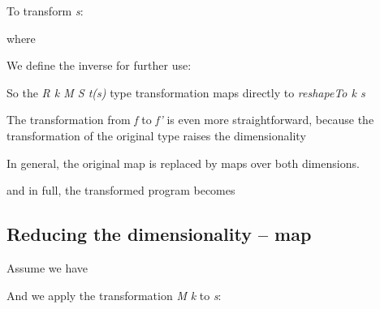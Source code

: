 \documentclass{article}
\newenvironment{lyxcode}
{\par\begin{list}{}{
\setlength{\rightmargin}{\leftmargin}
\setlength{\listparindent}{0pt}\raggedright
\setlength{\itemsep}{0pt}
\setlength{\parsep}{0pt}
\normalfont\ttfamily}\item[]}
{\end{list}}
\begin{document}
To transform \emph{s}:
\begin{lyxcode}

\end{lyxcode}
where
\begin{lyxcode}

\end{lyxcode}
We define the inverse for further use:
\begin{lyxcode}

\end{lyxcode}
So the \emph{R k M S t(s)} type transformation maps directly to \emph{reshapeTo
k s}

The transformation from \emph{f} to \emph{f'} is even more straightforward,
because the transformation of the original type raises the dimensionality
\begin{lyxcode}

\end{lyxcode}
In general, the original map is replaced by maps over both dimensions.
\begin{lyxcode}

\end{lyxcode}
and in full, the transformed program becomes

\begin{lyxcode}

\end{lyxcode}


\subsection{Reducing the dimensionality -- map}

Assume we have
\begin{lyxcode}
\textrm{}

\textrm{}






\end{lyxcode}
And we apply the transformation\emph{ M } \emph{k}
to \emph{s}:





\emph{}
\end{document}

